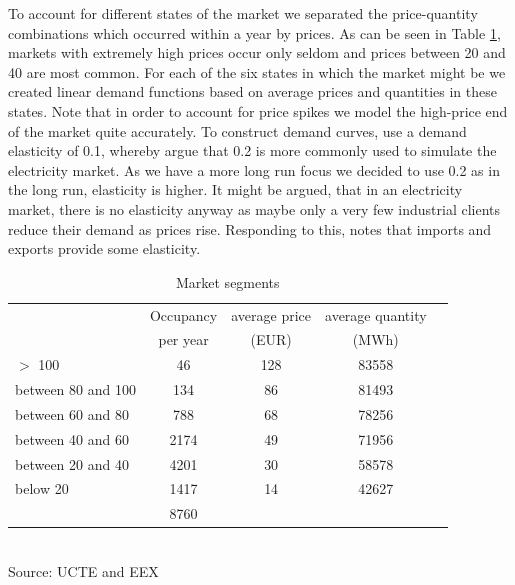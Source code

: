 To account for different states of the market we separated the price-quantity combinations which occurred within a year by prices. As can be seen in Table \ref{tab:demand}, markets with extremely high prices occur only seldom and prices between 20 and 40 are most common. For each of the six states in which the market might be we created linear demand functions based on average prices and quantities in these states. Note that in order to account for price spikes we model the high-price end of the market quite accurately. To construct demand curves, \cite{Neuhoff2005} use a demand elasticity of 0.1, whereby \cite{Genc2007} argue that 0.2 is more commonly used to simulate the electricity market. As we have a more long run focus we decided to use 0.2 as in the long run, elasticity is higher. It might be argued, that in an electricity market, there is no elasticity anyway as maybe only a very few industrial clients reduce their demand as prices rise. Responding to this, \cite{Bushnell2003} notes that imports and exports provide some elasticity.

\begin{table}[htb]
\centering
\caption{Market segments}
\vspace{0.3cm}
\begin{tabular}{lllll}
\hline
 & \multicolumn{1}{c}{Occupancy} & \multicolumn{1}{c}{average price} & \multicolumn{1}{c}{average quantity} &  \\ 
 & \multicolumn{1}{c}{per year} & \multicolumn{1}{c}{(EUR)} & \multicolumn{1}{c}{(MWh)} &  \\ 
 \hline
$>$ 100 & \multicolumn{1}{c}{46} & \multicolumn{1}{c}{128} & \multicolumn{1}{c}{83558} &  \\ 
between 80 and 100 & \multicolumn{1}{c}{134} & \multicolumn{1}{c}{86} & \multicolumn{1}{c}{81493} &  \\ 
between 60 and 80 & \multicolumn{1}{c}{788} & \multicolumn{1}{c}{68} & \multicolumn{1}{c}{78256} &  \\ 
between 40 and 60 & \multicolumn{1}{c}{2174} & \multicolumn{1}{c}{49} & \multicolumn{1}{c}{71956} &  \\ 
between 20 and 40 & \multicolumn{1}{c}{4201} & \multicolumn{1}{c}{30} & \multicolumn{1}{c}{58578} &  \\ 
below 20 & \multicolumn{1}{c}{1417} & \multicolumn{1}{c}{14} & \multicolumn{1}{c}{42627} &  \\
\hline
 & \multicolumn{1}{c}{8760} &  &  &  \\ 
 \hline
\end{tabular}
\label{tab:demand}
\\
\vspace{0.3cm}
\scriptsize Source: UCTE and EEX 
\end{table}

